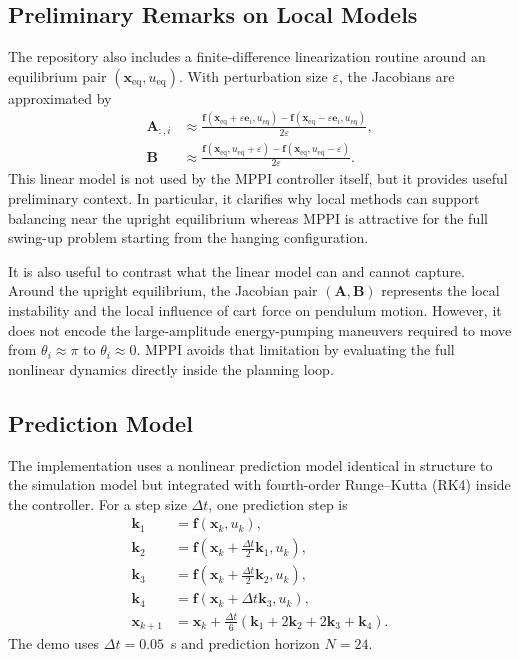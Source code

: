 \documentclass[conference]{IEEEtran}
\begin{document}
\subsection{Preliminary Remarks on Local Models}
The repository also includes a finite-difference linearization routine around an equilibrium pair $(\bm{x}_{\mathrm{eq}},u_{\mathrm{eq}})$. With perturbation size $\varepsilon$, the Jacobians are approximated by
\begin{align}
\bm{A}_{:,i} &\approx \frac{\bm{f}(\bm{x}_{\mathrm{eq}}+\varepsilon \bm{e}_i, u_{\mathrm{eq}})
- \bm{f}(\bm{x}_{\mathrm{eq}}-\varepsilon \bm{e}_i, u_{\mathrm{eq}})}{2\varepsilon}, \\
\bm{B} &\approx \frac{\bm{f}(\bm{x}_{\mathrm{eq}}, u_{\mathrm{eq}}+\varepsilon)
- \bm{f}(\bm{x}_{\mathrm{eq}}, u_{\mathrm{eq}}-\varepsilon)}{2\varepsilon}.
\end{align}
This linear model is not used by the MPPI controller itself, but it provides useful preliminary context. In particular, it clarifies why local methods can support balancing near the upright equilibrium whereas MPPI is attractive for the full swing-up problem starting from the hanging configuration.

It is also useful to contrast what the linear model can and cannot capture. Around the upright equilibrium, the Jacobian pair $(\bm{A},\bm{B})$ represents the local instability and the local influence of cart force on pendulum motion. However, it does not encode the large-amplitude energy-pumping maneuvers required to move from $\theta_i \approx \pi$ to $\theta_i \approx 0$. MPPI avoids that limitation by evaluating the full nonlinear dynamics directly inside the planning loop.

\subsection{Prediction Model}
The implementation uses a nonlinear prediction model identical in structure to the simulation model but integrated with fourth-order Runge--Kutta (RK4) inside the controller. For a step size $\Delta t$, one prediction step is
\begin{align}
\bm{k}_1 &= \bm{f}(\bm{x}_k, u_k), \\
\bm{k}_2 &= \bm{f}\!\left(\bm{x}_k + \frac{\Delta t}{2}\bm{k}_1, u_k\right), \\
\bm{k}_3 &= \bm{f}\!\left(\bm{x}_k + \frac{\Delta t}{2}\bm{k}_2, u_k\right), \\
\bm{k}_4 &= \bm{f}\!\left(\bm{x}_k + \Delta t \bm{k}_3, u_k\right), \\
\bm{x}_{k+1} &= \bm{x}_k + \frac{\Delta t}{6}\left(\bm{k}_1 + 2\bm{k}_2 + 2\bm{k}_3 + \bm{k}_4\right).
\end{align}
The demo uses $\Delta t = 0.05$~s and prediction horizon $N=24$.
\end{document}
